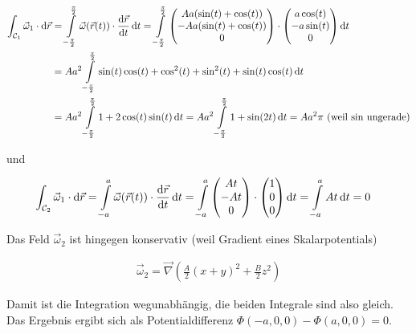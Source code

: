 \documentclass[a4paper,german,12pt,smallheadings]{scrartcl}
\begin{document}
\begin{align*}
  \int_{\mathcal{C}_1} \vec{\omega}_1 \cdot \dif\vec{r}
  &= \int\limits_{-\frac{\pi}{2}}^{\frac{\pi}{2}} \vec{\omega}(\vec{r}(t)) \cdot \frac{\dif\vec{r}}{\dif t} \dif t
  = \int\limits_{-\frac{\pi}{2}}^{\frac{\pi}{2}} \begin{pmatrix} Aa(\sin(t) + \cos(t)) \\ -Aa(\sin(t) + \cos(t)) \\ 0 \end{pmatrix} \cdot \begin{pmatrix} a\cos(t) \\ -a\sin(t) \\ 0 \end{pmatrix} \dif t \\
  &= Aa^2 \int\limits_{-\frac{\pi}{2}}^{\frac{\pi}{2}} \sin(t)\cos(t) + \cos^2(t) + \sin^2(t) + \sin(t)\cos(t) \dif t \\
  &= Aa^2 \int\limits_{-\frac{\pi}{2}}^{\frac{\pi}{2}} 1 + 2\cos(t)\sin(t) \dif t
  = Aa^2 \int\limits_{-\frac{\pi}{2}}^{\frac{\pi}{2}} 1 + \sin(2t) \dif t
  = Aa^2 \pi \text{ (weil $\sin$ ungerade)}
\end{align*}

und

\begin{align*}
  \int_{\mathcal{C}_2} \vec{\omega}_1 \cdot \dif\vec{r}
  &= \int\limits_{-a}^{a} \vec{\omega}(\vec{r}(t)) \cdot \frac{\dif\vec{r}}{\dif t} \dif t
  = \int\limits_{-a}^{a} \begin{pmatrix} At \\ -At \\ 0  \end{pmatrix} \cdot \begin{pmatrix} 1 \\ 0 \\ 0\end{pmatrix} \dif t
  = \int\limits_{-a}^{a} At \dif t = 0
\end{align*}

Das Feld $\vec{\omega}_2$ ist hingegen konservativ (weil Gradient eines Skalarpotentials)

\begin{align*}
  \vec{\omega}_2 = \vec{\nabla} \left( \frac{A}{2} (x+y)^2 + \frac{B}{2} z^2 \right)
\end{align*}

Damit ist die Integration wegunabhängig, die beiden Integrale sind also gleich.
Das Ergebnis ergibt sich als Potentialdifferenz $\Phi(-a, 0, 0) - \Phi(a, 0, 0)
= 0$.
\end{document}
